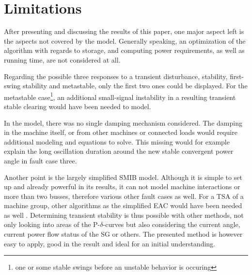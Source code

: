 \section{Limitations}

After presenting and discussing the results of this paper, one major aspect left is the aspects not covered by the model. Generally speaking, an optimization of the algorithm with regards to storage, and computing power requirements, as well as running time, are not considered at all. 

Regarding the possible three responses to a transient disturbance, stability, first-swing stability and metastable, only the first two ones could be displayed. For the metastable case\footnote{one or some stable swings before an unstable behavior is occuring}, an additional small-signal instability in a resulting transient stable clearing would have been needed to model. \autocite{kundurPowerSystemStability2022}

In the model, there was no single damping mechanism considered. The damping in the machine itself, or from other machines or connected loads would require additional modeling and equations to solve. This missing would for example explain the long oscillation duration around the new stable convergent power angle in fault case three.

Another point is the largely simplified \acs{SMIB} model. Although it is simple to set up and already powerful in its results, it can not model machine interactions or more than two busses, therefore various other fault cases as well. For a \acs{TSA} of a machine group, other algorithms as the simplified \acs{EAC} would have been needed as well \autocite{batchuComparativeStudyEqual2022}. Determining transient stability is thus possible with other methods, not only looking into areas of the P-$\delta$-curves but also considering the current angle, current power flow status of the \acs{SG} or others. The presented method is however easy to apply, good in the result and ideal for an initial understanding.